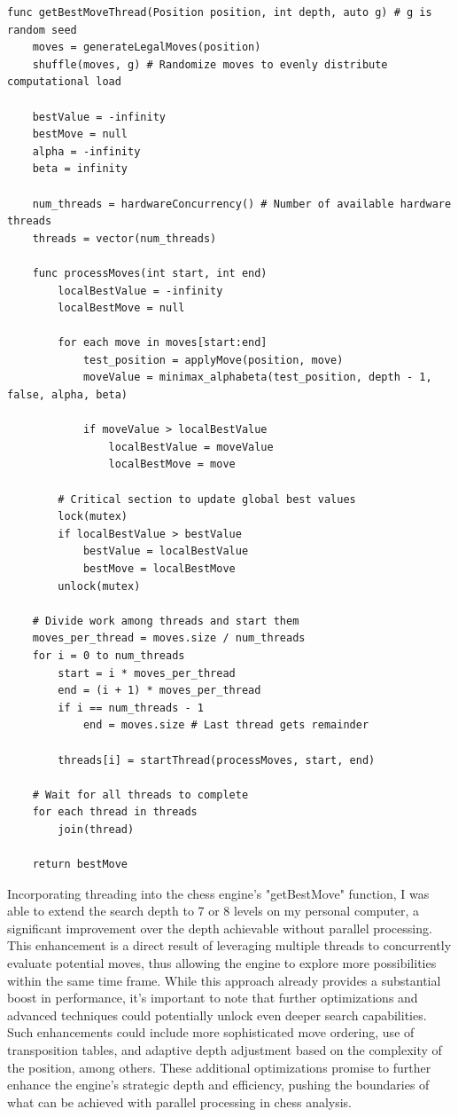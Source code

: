 \documentclass{article}
\begin{document}
\begin{lstlisting}[caption= Threading in Getting Best Move, label=lst:pseudocode]
func getBestMoveThread(Position position, int depth, auto g) # g is random seed
    moves = generateLegalMoves(position)
    shuffle(moves, g) # Randomize moves to evenly distribute computational load

    bestValue = -infinity
    bestMove = null
    alpha = -infinity
    beta = infinity

    num_threads = hardwareConcurrency() # Number of available hardware threads
    threads = vector(num_threads)

    func processMoves(int start, int end)
        localBestValue = -infinity
        localBestMove = null

        for each move in moves[start:end]
            test_position = applyMove(position, move)
            moveValue = minimax_alphabeta(test_position, depth - 1, false, alpha, beta)

            if moveValue > localBestValue
                localBestValue = moveValue
                localBestMove = move

        # Critical section to update global best values
        lock(mutex)
        if localBestValue > bestValue
            bestValue = localBestValue
            bestMove = localBestMove
        unlock(mutex)

    # Divide work among threads and start them
    moves_per_thread = moves.size / num_threads
    for i = 0 to num_threads
        start = i * moves_per_thread
        end = (i + 1) * moves_per_thread
        if i == num_threads - 1
            end = moves.size # Last thread gets remainder

        threads[i] = startThread(processMoves, start, end)

    # Wait for all threads to complete
    for each thread in threads
        join(thread)

    return bestMove
\end{lstlisting}

Incorporating threading into the chess engine's "getBestMove" function, I was able to extend the search depth to 7 or 8 levels on my personal computer, a significant improvement over the depth achievable without parallel processing. This enhancement is a direct result of leveraging multiple threads to concurrently evaluate potential moves, thus allowing the engine to explore more possibilities within the same time frame. While this approach already provides a substantial boost in performance, it's important to note that further optimizations and advanced techniques could potentially unlock even deeper search capabilities. Such enhancements could include more sophisticated move ordering, use of transposition tables, and adaptive depth adjustment based on the complexity of the position, among others. These additional optimizations promise to further enhance the engine's strategic depth and efficiency, pushing the boundaries of what can be achieved with parallel processing in chess analysis.
\end{document}
